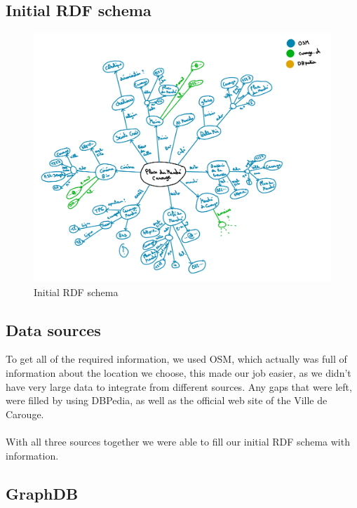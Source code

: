 \documentclass[a4paper]{article}
\begin{document}
\subsection*{Initial RDF schema}
\begin{figure}[H]
\center
\includegraphics[width=1\textwidth]{images/Graph.PNG}
\caption{Initial RDF schema}
\end{figure}
\subsection*{Data sources}
To get all of the required information, we used OSM, which actually was full of information about the location we choose, this made our job easier, as we didn't have very large data to integrate from different sources. Any gaps that were left, were filled by using DBPedia, as well as the official web site of the Ville de Carouge.\\\\ With all three sources together we were able to fill our initial RDF schema with information.

\subsection*{GraphDB}
\end{document}
